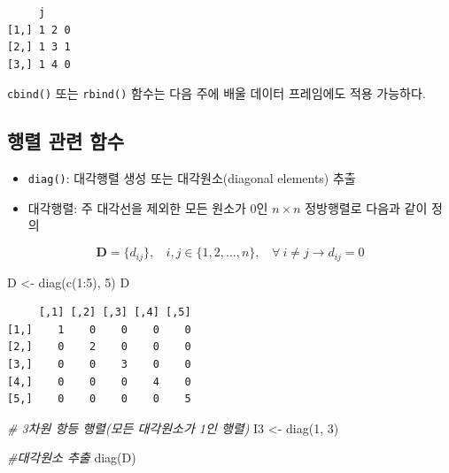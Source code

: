 \documentclass[
  11pt,
]{krantz}
\makeatletter
\newenvironment{Shaded}{\begin{snugshade}}{\end{snugshade}}
\newcommand{\CommentTok}[1]{\textcolor[rgb]{0.37,0.37,0.37}{\textit{#1}}}
\newcommand{\DecValTok}[1]{\textcolor[rgb]{0.06,0.06,0.06}{#1}}
\newcommand{\FunctionTok}[1]{\textcolor[rgb]{0,0,0}{#1}}
\newcommand{\NormalTok}[1]{#1}
\newcommand{\OtherTok}[1]{\textcolor[rgb]{0.37,0.37,0.37}{#1}}
\newcommand{\SpecialCharTok}[1]{\textcolor[rgb]{0,0,0}{#1}}
\providecommand{\tightlist}{%
  \setlength{\itemsep}{0pt}\setlength{\parskip}{0pt}}
\newenvironment{kframe}{%
\medskip{}
\setlength{\fboxsep}{.8em}
 \def\at@end@of@kframe{}%
 \ifinner\ifhmode%
  \def\at@end@of@kframe{\end{minipage}}%
  \begin{minipage}{\columnwidth}%
 \fi\fi%
 \def\FrameCommand##1{\hskip\@totalleftmargin \hskip-\fboxsep
 \colorbox{shadecolor}{##1}\hskip-\fboxsep
     \hskip-\linewidth \hskip-\@totalleftmargin \hskip\columnwidth}%
 \MakeFramed {\advance\hsize-\width
   \@totalleftmargin\z@ \linewidth\hsize
   \@setminipage}}%
 {\par\unskip\endMakeFramed%
 \at@end@of@kframe}
\newenvironment{rmdblock}[1]
  {
  \begin{itemize}
  \renewcommand{\labelitemi}{
    \raisebox{-.7\height}[0pt][0pt]{
      {\setkeys{Gin}{width=3em,keepaspectratio}\texttt{[image: images/\#1]}}
    }
  }
  \setlength{\fboxsep}{1em}
  \begin{kframe}
  \item
  }
  {
  \end{kframe}
  \end{itemize}
  }
\newenvironment{rmdnote}
  {\begin{rmdblock}{note}}
  {\end{rmdblock}}
\makeatother
\begin{document}
\begin{verbatim}
     j    
[1,] 1 2 0
[2,] 1 3 1
[3,] 1 4 0
\end{verbatim}

\normalsize

\footnotesize

\begin{rmdnote}
\texttt{cbind()} 또는 \texttt{rbind()} 함수는 다음 주에 배울 데이터 프레임에도 적용 가능하다.
\end{rmdnote}

\normalsize

\hypertarget{uxd589uxb82c-uxad00uxb828-uxd568uxc218}{%
\subsection{행렬 관련 함수}\label{uxd589uxb82c-uxad00uxb828-uxd568uxc218}}

\begin{itemize}
\tightlist
\item
  \texttt{diag()}: 대각행렬 생성 또는 대각원소(diagonal elements) 추출
\item
  대각행렬: 주 대각선을 제외한 모든 원소가 0인 \(n\times n\) 정방행렬로 다음과 같이 정의
\end{itemize}

\[
 \mathrm{\mathbf{D}} = \{d_{ij}\},~~~~i, j \in \{1, 2, \ldots, n\},~~~~\forall~ i \neq j \rightarrow d_{ij} = 0
\]
\footnotesize

\begin{Shaded}
\begin{Highlighting}[]
\NormalTok{D }\OtherTok{\textless{}{-}} \FunctionTok{diag}\NormalTok{(}\FunctionTok{c}\NormalTok{(}\DecValTok{1}\SpecialCharTok{:}\DecValTok{5}\NormalTok{), }\DecValTok{5}\NormalTok{)}
\NormalTok{D}
\end{Highlighting}
\end{Shaded}

\begin{verbatim}
     [,1] [,2] [,3] [,4] [,5]
[1,]    1    0    0    0    0
[2,]    0    2    0    0    0
[3,]    0    0    3    0    0
[4,]    0    0    0    4    0
[5,]    0    0    0    0    5
\end{verbatim}

\begin{Shaded}
\begin{Highlighting}[]
\CommentTok{\# 3차원 항등 행렬(모든 대각원소가 1인 행렬)}
\NormalTok{I3 }\OtherTok{\textless{}{-}} \FunctionTok{diag}\NormalTok{(}\DecValTok{1}\NormalTok{, }\DecValTok{3}\NormalTok{)}

\CommentTok{\#대각원소 추출}
\FunctionTok{diag}\NormalTok{(D)}
\end{Highlighting}
\end{Shaded}
\end{document}
